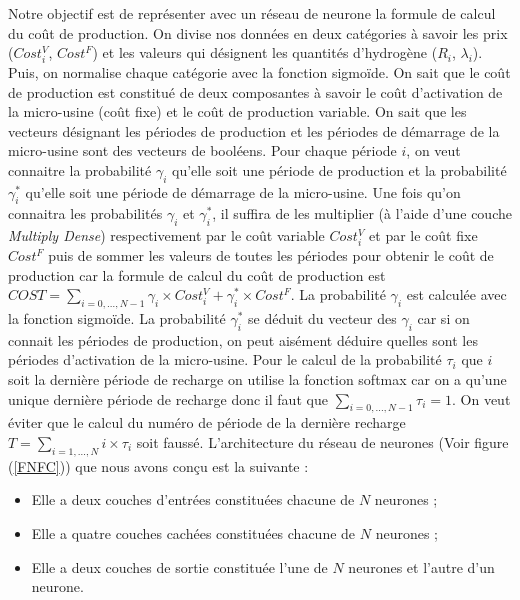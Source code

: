 Notre objectif est de représenter avec un réseau de neurone la formule de calcul du coût de production. On divise nos données en deux catégories à savoir les prix ($Cost_i^V$, $Cost^F$) et les valeurs qui désignent les quantités d'hydrogène ($R_i$, $\lambda_i$). Puis, on normalise chaque catégorie avec la fonction sigmoïde.
On sait que le coût de production est constitué de deux composantes à savoir le coût d'activation de la micro-usine (coût fixe) et le coût de production variable.
On sait que les vecteurs désignant les périodes de production et les périodes de démarrage de la micro-usine sont des vecteurs de booléens. Pour chaque période $i$, on veut connaitre la probabilité $\gamma_i$ qu'elle soit une période de production et la probabilité $\gamma_i^*$ qu'elle soit une période de démarrage de la micro-usine.
Une fois qu'on connaitra les probabilités $\gamma_i$ et $\gamma_i^*$, il suffira de les multiplier (à l'aide d'une couche \textit{Multiply Dense}) respectivement par le coût variable $Cost_i^V$ et par le coût fixe $Cost^F$ puis de sommer les valeurs de toutes les périodes pour obtenir le coût de production car la formule de calcul du coût de production est $COST=\sum_{ i = 0, \dots, N -1} \gamma_i \times Cost_i^V + \gamma_i^* \times Cost^F$.
La probabilité $\gamma_i$ est calculée avec la fonction sigmoïde. La probabilité $\gamma_i^*$ se déduit du vecteur des $\gamma_i$ car si on connait les périodes de production, on peut aisément déduire quelles sont les périodes d'activation de la micro-usine.
Pour le calcul de la probabilité $\tau_i$ que $i$ soit la dernière période de recharge on utilise la fonction softmax car on a qu'une unique dernière période de recharge donc il faut que $\sum_{ i = 0, \dots, N -1}\tau_i=1$. On veut éviter que le calcul du numéro de période de la dernière recharge $T=\sum_{i=1, \dots, N} i \times \tau_i$ soit faussé.
L'architecture du réseau de neurones (Voir figure (\ref{FNFC})) que nous avons conçu est la suivante :

\begin{itemize}[label=$\square$]
	\item Elle a deux couches d'entrées constituées chacune de $N$ neurones ;
	\item Elle a quatre couches cachées constituées chacune de $N$ neurones ;
	\item Elle a deux couches de sortie constituée l'une de $N$ neurones et l'autre d'un neurone.
\end{itemize}   

